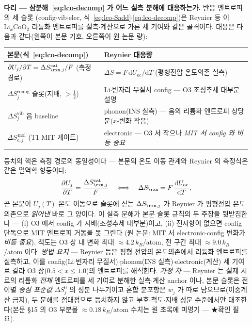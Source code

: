 \begin{srcbox}
\textbf{다리 --- 삼분해~\eqref{eq:lco-decomp} 가 어느 실측 분해에 대응하는가.} 반응 엔트로피의 세 슬롯
(config$\cdot$vib$\cdot$elec, 식~\eqref{eq:lco-Sadd}$\cdot$\eqref{eq:lco-decomp})은 Reynier
등\cite{reynier2004} 이 $\mathrm{Li}_x\mathrm{CoO_2}$ 리튬화 엔트로피를 실측$\cdot$계산으로 가른 세 기여와
같은 골격이다. 대응은 다음과 같다(왼쪽이 본문 기호, 오른쪽이 원 논문 량):
\begin{center}\footnotesize
\begin{tabular}{@{}ll@{}}
\hline
본문(식~\eqref{eq:lco-decomp}) & Reynier\cite{reynier2004} 대응량 \\
\hline
$\partial U_j/\partial T=\Delta S_{\rxn,j}^\mathrm{cat}/F$ (측정 경로) & $\Delta S=F\,\mathrm dU_\mathrm{oc}/\mathrm dT$ (평형전압 온도의존 실측) \\
$\Delta S_j^\mathrm{config}$ 슬롯(지배, $>\tfrac12$) & Li$\cdot$빈자리 무질서 config --- O3 조성추세 대부분 설명 \\
$\Delta S_j^\mathrm{vib}$ 음 baseline & phonon(INS 실측) --- 음의 리튬화 엔트로피 상당분($x$-변화 작음) \\
$\Delta S_{e,j}^{\,\mathrm{mol}}$ (T1 MIT 게이트) & electronic --- O3 서 작으나 \emph{MIT 서 config 와 비등 중요} \\
\hline
\end{tabular}
\end{center}
등치의 핵은 측정 경로의 동일성이다 --- 본문의 온도 이동 관계와 Reynier 의 측정식은 같은 열역학
항등이다:
\begin{equation}
\frac{\partial U_j}{\partial T}=\frac{\Delta S_{\rxn,j}^\mathrm{cat}}{F}
\quad\Longleftrightarrow\quad
\Delta S_{\rxn}=F\,\frac{\mathrm dU_\mathrm{oc}}{\mathrm dT},
\label{eq:br-reynier2004-1}
\end{equation}
곧 본문이 $U_j(T)$ 온도 이동으로 슬롯에 싣는 $\Delta S_{\rxn,j}$ 가 Reynier 가 평형전압 온도의존으로
\emph{읽어낸} 바로 그 양이다. 이 실측 분해가 본문 슬롯 규칙의 두 주장을 뒷받침한다 --- (i) O3 에서
config 가 지배(조성추세 대부분)이고, (ii) 전자항이 없으면 config 단독으로 MIT 엔트로피 거동을 못 그린다
(원 논문: MIT 서 electronic$\cdot$config 변화가 \emph{비등 중요}). 척도는 O3 상 내 변화 최대
$\approx4.2\,k_B$/atom, 전 구간 최대 $\approx9.0\,k_B$/atom 이다. \emph{방법 요지} --- Reynier 등은 평형
전압의 온도의존에서 리튬화 엔트로피를 실측하고, 이를 config(Li$\cdot$빈자리 무질서)$\cdot$phonon(INS
실측)$\cdot$electronic(계산) 세 기여로 갈라 O3 상($0.5{<}x{\le}1.0$)의 엔트로피를 해석한다. \emph{가정
차} --- Reynier 는 실제 시료의 리튬화 \emph{전체} 엔트로피를 세 기여로 분해한 실측$\cdot$계산 anchor 이나,
본문 슬롯은 전이별 \emph{중심 표준값} $\Delta S_j^0$ 의 성분 나누기이고 혼합 분포항은 $w_j$ 가 따로
담으므로(이중계산 금지), 두 분해를 점대점으로 등치하지 않고 부호$\cdot$척도$\cdot$지배 성분 수준에서만
대조한다(본문 §15 의 O3 부분몰 $\approx0.18\,k_B$/atom 수치는 원 초록에 미명기 --- ★확인 필요).
\end{srcbox}
